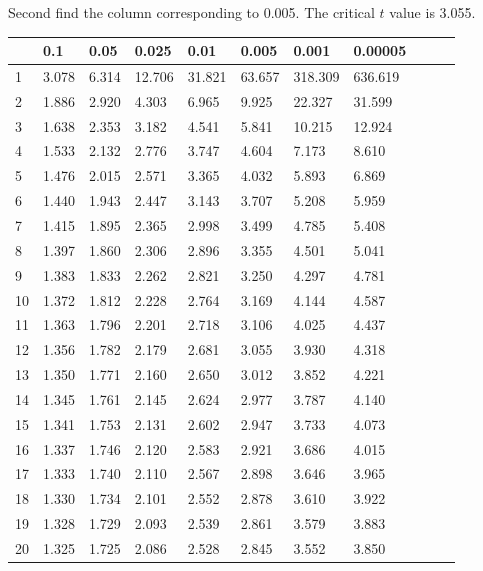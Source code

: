 \begin{frame}
{\small Second find the column corresponding to 0.005. The critical $t$ value is 3.055.}

  {
\fontsize{5pt}{5pt}
\selectfont

\begin{tabular}{l|llll>{\columncolor{blue}}llllll}
 & 0.1&0.05&0.025&0.01&0.005&0.001&0.00005\\ \hline
 1 & 3.078 & 6.314 & 12.706 & 31.821 & 63.657 & 318.309 & 636.619 \\ 
 2 & 1.886 & 2.920 & 4.303 & 6.965 & 9.925 & 22.327 & 31.599 \\ 
 3 & 1.638 & 2.353 & 3.182 & 4.541 & 5.841 & 10.215 & 12.924 \\ 
 4 & 1.533 & 2.132 & 2.776 & 3.747 & 4.604 & 7.173 & 8.610 \\ 
 5 & 1.476 & 2.015 & 2.571 & 3.365 & 4.032 & 5.893 & 6.869 \\ 
[5pt]
 6 & 1.440 & 1.943 & 2.447 & 3.143 & 3.707 & 5.208 & 5.959 \\ 
 7 & 1.415 & 1.895 & 2.365 & 2.998 & 3.499 & 4.785 & 5.408 \\ 
 8 & 1.397 & 1.860 & 2.306 & 2.896 & 3.355 & 4.501 & 5.041 \\ 
 9 & 1.383 & 1.833 & 2.262 & 2.821 & 3.250 & 4.297 & 4.781 \\ 
10 & 1.372 & 1.812 & 2.228 & 2.764 & 3.169 & 4.144 & 4.587 \\ 
[5pt]
11 & 1.363 & 1.796 & 2.201 & 2.718 & 3.106 & 4.025 & 4.437 \\ 
\rowcolor{red}12 & 1.356 & 1.782 & 2.179 & 2.681 & 3.055 & 3.930 & 4.318 \\ 
13 & 1.350 & 1.771 & 2.160 & 2.650 & 3.012 & 3.852 & 4.221 \\ 
14 & 1.345 & 1.761 & 2.145 & 2.624 & 2.977 & 3.787 & 4.140 \\ 
15 & 1.341 & 1.753 & 2.131 & 2.602 & 2.947 & 3.733 & 4.073 \\ 
[5pt]
16 & 1.337 & 1.746 & 2.120 & 2.583 & 2.921 & 3.686 & 4.015 \\ 
17 & 1.333 & 1.740 & 2.110 & 2.567 & 2.898 & 3.646 & 3.965 \\ 
18 & 1.330 & 1.734 & 2.101 & 2.552 & 2.878 & 3.610 & 3.922 \\ 
19 & 1.328 & 1.729 & 2.093 & 2.539 & 2.861 & 3.579 & 3.883 \\ 
20 & 1.325 & 1.725 & 2.086 & 2.528 & 2.845 & 3.552 & 3.850 \\ 

\end{tabular}}
\end{frame}
